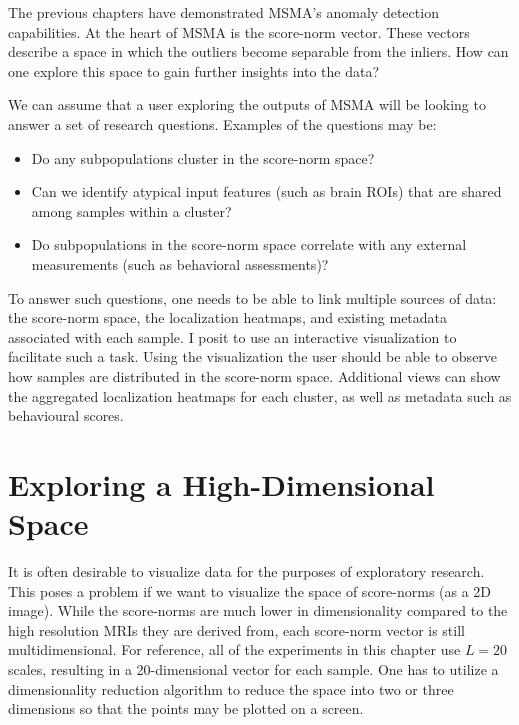 The previous chapters have demonstrated MSMA's anomaly detection capabilities. At the heart of MSMA is the score-norm vector. These vectors describe a space in which the outliers become separable from the inliers. How can one explore this space to gain further insights into the data?

We can assume that a user exploring the outputs of MSMA will be looking to answer a set of research questions. Examples of the questions may be:
\begin{itemize}
    \item Do any subpopulations cluster in the score-norm space?
    \item Can we identify atypical input features (such as brain ROIs)  that are shared among samples within a cluster?
    \item Do subpopulations in the score-norm space correlate with any external measurements (such as behavioral assessments)?
\end{itemize}

To answer such questions, one needs to be able to link multiple sources of data: the score-norm space, the localization heatmaps, and existing metadata associated with each sample. I posit to use an interactive visualization to facilitate such a task.
Using the visualization the user should be able to observe how samples are distributed in the score-norm space. Additional views can show the aggregated localization heatmaps for each cluster, as well as metadata such as behavioural scores.


\section{Exploring a High-Dimensional Space}

It is often desirable to visualize data for the purposes of exploratory research. This poses a problem if we want to visualize the space of score-norms (as a 2D image). While the score-norms are much lower in dimensionality compared to the high resolution MRIs they are derived from, each score-norm vector is still multidimensional. For reference, all of the experiments in this chapter use $L=20$ scales, resulting in a 20-dimensional vector for each sample. One has to utilize a dimensionality reduction algorithm to reduce the space into two or three dimensions so that the points may be plotted on a screen.

